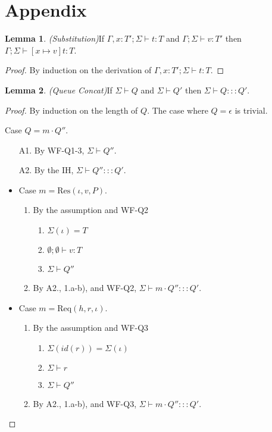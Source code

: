 \documentclass{article}
\theoremstyle{definition}
\newtheorem{lem}{Lemma}[section]
\newcommand{\Req}[3]{\text{Req}(#1, #2, #3)}
\newcommand{\ResP}[3]{\text{Res}(#1, #2, #3)}
\begin{document}
\newpage
\section{Appendix}

\begin{lem}
\emph{(Substitution)}\label{th:subst}
If $\Gamma , x : T' ; \Sigma \vdash t : T$ and $\Gamma ; \Sigma \vdash v : T'$ then $\Gamma ; \Sigma \vdash [x \mapsto v]t : T$.
\end{lem}
\begin{proof}
By induction on the derivation of $\Gamma , x : T' ; \Sigma \vdash t : T$.
\end{proof}

\begin{lem}
\emph{(Queue Concat)}\label{lem:queue-concat}
If $\Sigma \vdash Q$ and $\Sigma \vdash Q'$ then $\Sigma \vdash Q ::: Q'$.
\end{lem}
\begin{proof}
By induction on the length of $Q$. The case where $Q = \epsilon$ is trivial.

Case $Q = m \cdot Q''$.
\begin{enumerate}
\item[A1.] By \textsc{WF-Q1-3}, $\Sigma \vdash Q''$.
\item[A2.] By the IH, $\Sigma \vdash Q'' ::: Q'$.
\end{enumerate}

\begin{itemize}
\item Case $m = {\ResP \iota v P}$.
\begin{enumerate}
\item By the assumption and \textsc{WF-Q2}
  \begin{enumerate}[label=(\alph*)]
  \item $\Sigma(\iota) = T$
  \item $\emptyset ; \emptyset \vdash v : T$
  \item $\Sigma \vdash Q''$
  \end{enumerate}
\item By A2., 1.a-b), and \textsc{WF-Q2}, $\Sigma \vdash m \cdot Q'' ::: Q'$.
\end{enumerate}

\item Case $m = {\Req h r \iota}$.
\begin{enumerate}
\item By the assumption and \textsc{WF-Q3}
  \begin{enumerate}[label=(\alph*)]
  \item $\Sigma(id(r)) = \Sigma(\iota)$
  \item $\Sigma \vdash r$
  \item $\Sigma \vdash Q''$
  \end{enumerate}
\item By A2., 1.a-b), and \textsc{WF-Q3}, $\Sigma \vdash m \cdot Q'' ::: Q'$.
\end{enumerate}
\end{itemize}
\end{proof}
\end{document}
